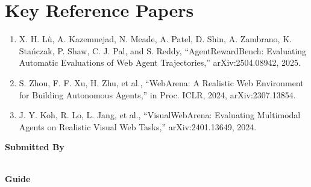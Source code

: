 \documentclass[11pt]{article}
\begin{document}
\section*{Key Reference Papers}
\begin{enumerate}
  \item X. H. L\`u, A. Kazemnejad, N. Meade, A. Patel, D. Shin, A. Zambrano, K. Sta\'nczak, P. Shaw, C. J. Pal, and S. Reddy, ``AgentRewardBench: Evaluating Automatic Evaluations of Web Agent Trajectories,'' arXiv:2504.08942, 2025.
  \item S. Zhou, F. F. Xu, H. Zhu, et al., ``WebArena: A Realistic Web Environment for Building Autonomous Agents,'' in Proc. ICLR, 2024, arXiv:2307.13854.
  \item J. Y. Koh, R. Lo, L. Jang, et al., ``VisualWebArena: Evaluating Multimodal Agents on Realistic Visual Web Tasks,'' arXiv:2401.13649, 2024.
\end{enumerate}
\vspace{0.8em}
\noindent\textbf{Submitted By}\\
\seminarName\\
\seminarRoll

\vspace{0.6em}
\noindent\textbf{Guide}\\
\seminarGuide
\end{document}
